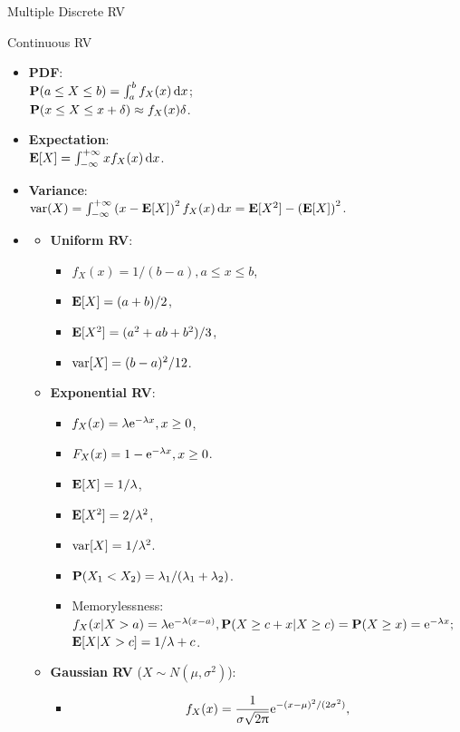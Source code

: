 \documentclass[landscape,a4paper]{article}
\begin{document}
\begin{cheatsheetcolumns}
\begin{card}{Multiple Discrete RV}
		\end{card}
		\begin{card}{Continuous RV}
			\begin{itemize}
				\item \textbf{PDF}:\\ $\mathbf{P}(a\le X\le b)=\int_a^bf_X(x)\,\mathrm dx$;\\
				$\mathbf{P}(x\le X\le x+\delta)\approx f_X(x)\delta$.
				\item \textbf{Expectation}:\\ $\mathbf{E}[X]=\int_{-\infty}^{+\infty} xf_X(x)\,\mathrm dx$.
				\item \textbf{Variance}:\\ $\operatorname{var}(X)=\int_{-\infty}^{+\infty}\left(x-\mathbf{E}[X]\right)^2f_X(x)\,\mathrm dx=\mathbf{E}[X^2]-\left(\mathbf{E}[X]\right)^2$.
				\item \begin{itemize}
					\item \textbf{Uniform RV}:
					\begin{itemize}
						\item $f_X(x)=1/(b-a),a\le x\le b$,
						\item $\mathbf{E}[X]=(a+b)/2$,
						\item $\mathbf{E}[X^2]=(a^2+ab+b^2)/3$,
						\item $\operatorname{var}[X]=(b-a)^2/12$.
					\end{itemize}
					\item \textbf{Exponential RV}:
					\begin{itemize}
						\item $f_X(x)=\lambda\mathrm{e}^{-\lambda x},x\ge 0$,
						\item $F_X(x)=1-\mathrm{e}^{-\lambda x},x\ge 0$.
						\item $\mathbf{E}[X]=1/\lambda$,
						\item $\mathbf{E}[X^2]=2/\lambda^2$,
						\item $\operatorname{var}[X]=1/\lambda^2$.
						\item $\mathbf{P}(X_1<X_2)=\lambda_1/(\lambda_1+\lambda_2)$.
						\item Memorylessness:\\
						$f_X(x|X>a)=\lambda \mathrm{e}^{-\lambda(x-a)}, \mathbf{P}(X\ge c+x|X\ge c)=\mathbf{P}(X\ge x)=\mathrm{e}^{-\lambda x};$\\$\mathbf{E}[X|X>c]=1/\lambda+c$.
					\end{itemize}
					\item \textbf{Gaussian RV} ($X\sim N(\mu,\sigma^2)$):
					\begin{itemize}
						\item \[f_X(x)=\frac{1}{\sigma\sqrt{2\uppi}}\mathrm{e}^{-(x-\mu)^2/(2\sigma^2)},\]

\end{itemize}
\end{itemize}
\end{itemize}
\end{card}
\end{cheatsheetcolumns}
\end{document}
